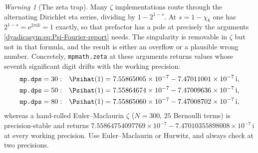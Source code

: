 \documentclass[11pt,oneside]{article}
\theoremstyle{definition}
\theoremstyle{remark}
\newtheorem{warning}[warning]{Warning}
\newcommand{\e}{\mathrm e}
\newcommand{\ii}{\mathrm i}
\begin{document}
\begin{warning}[The zeta trap]
Many $\zeta$ implementations route through the alternating Dirichlet eta
series, dividing by $1-2^{1-s}$.  At $s=1-\chi_k$ one has
$2^{1-s}=\e^{2\pi\ii k}=1$ exactly, so that prefactor has a pole at precisely
the arguments \cref{dyadicasym:eq:Psi-Fourier-report} needs.  The singularity is removable in $\zeta$
but not in that formula, and the result is either an overflow or a plausible
wrong number.  Concretely, \texttt{mpmath.zeta} at these arguments returns
values whose seventh significant digit drifts with the working precision:
\[
\begin{aligned}
  \texttt{mp.dps}=30:&\quad \Psihat(1)=7.55865005\times10^{-7}-7.47011001\times10^{-7}\,\ii,\\
  \texttt{mp.dps}=50:&\quad \Psihat(1)=7.55864674\times10^{-7}-7.47009636\times10^{-7}\,\ii,\\
  \texttt{mp.dps}=80:&\quad \Psihat(1)=7.55865060\times10^{-7}-7.47008702\times10^{-7}\,\ii,
\end{aligned}
\]
whereas a hand-rolled Euler--Maclaurin $\zeta$ ($N=300$, $25$ Bernoulli terms)
is precision-stable and returns
$7.55864754097769\times10^{-7}-7.47010355898008\times10^{-7}\,\ii$ at every
working precision.  Use Euler--Maclaurin or Hurwitz, and always check at two
precisions.
\end{warning}
\end{document}
